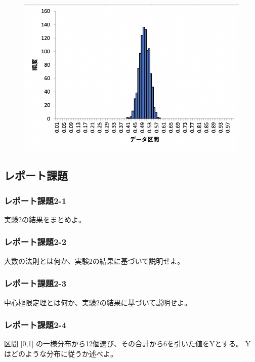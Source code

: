 \documentclass[12pt]{jarticle}
\begin{document}
\begin{figure}[h]
    \begin{center}
        \includegraphics[scale=0.7]{kadai4_2graph5.png}
    \end{center}
    \caption{}
\end{figure}

\subsection{レポート課題}
\subsubsection*{レポート課題2-1}
\begin{shadebox}
    実験2の結果をまとめよ。
\end{shadebox}

\subsubsection*{レポート課題2-2}
\begin{shadebox}
    大数の法則とは何か、実験2の結果に基づいて説明せよ。
\end{shadebox}

\subsubsection*{レポート課題2-3}
\begin{shadebox}
    中心極限定理とは何か、実験2の結果に基づいて説明せよ。
\end{shadebox}

\subsubsection*{レポート課題2-4}
\begin{shadebox}
    区間 [0,1] の一様分布から12個選び、その合計から6を引いた値をYとする。
    Y はどのような分布に従うか述べよ。
\end{shadebox}
\end{document}

